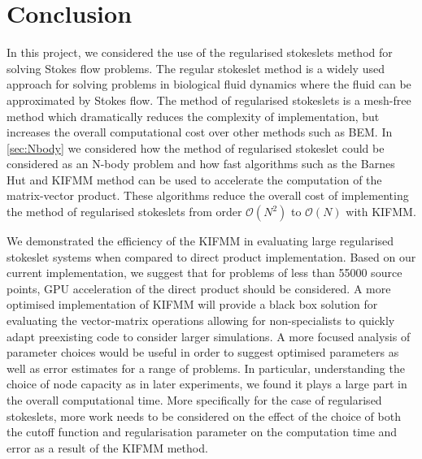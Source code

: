 \FloatBarrier
\section{Conclusion}
In this project, we considered the use of the regularised stokeslets method for solving Stokes flow problems. The regular stokeslet method is a widely used approach for solving problems in biological fluid dynamics where the fluid can be approximated by Stokes flow. The method of regularised stokeslets is a mesh-free method which dramatically reduces the complexity of implementation, but increases the overall computational cost over other methods such as BEM. In \cref{sec:Nbody} we considered how the method of regularised stokeslet could be considered as an N-body problem and how fast algorithms such as the Barnes Hut and KIFMM method can be used to accelerate the computation of the matrix-vector product. These algorithms reduce the overall cost of implementing the method of regularised stokeslets from order $\mathcal{O}(N^2)$ to $\mathcal{O}(N)$ with KIFMM. 

We demonstrated the efficiency of the KIFMM in evaluating large regularised stokeslet systems when compared to direct product implementation. Based on our current implementation, we suggest that for problems of less than 55000 source points, GPU acceleration of the direct product should be considered. A more optimised implementation of KIFMM will provide a black box solution for evaluating the vector-matrix operations allowing for non-specialists to quickly adapt preexisting code to consider larger simulations. A more focused analysis of parameter choices would be useful in order to suggest optimised parameters as well as error estimates for a range of problems. In particular, understanding the choice of node capacity as in later experiments, we found it plays a large part in the overall computational time. More specifically for the case of regularised stokeslets, more work needs to be considered on the effect of the choice of both the cutoff function and regularisation parameter on the computation time and error as a result of the KIFMM method.

